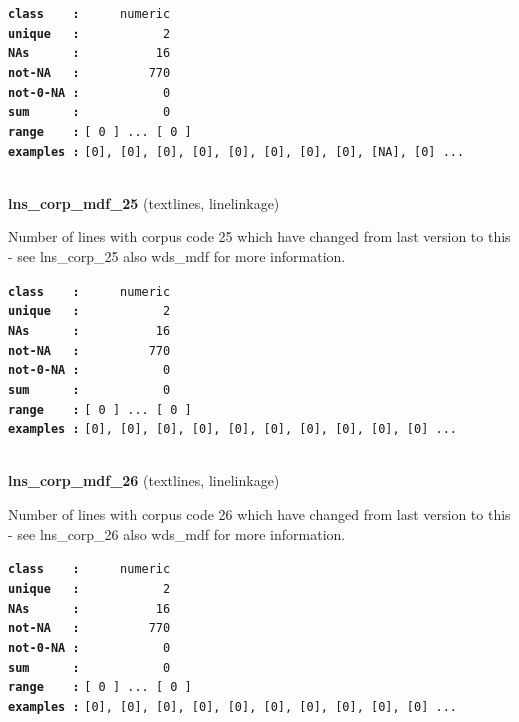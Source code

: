 \documentclass[]{article}
\begin{document}
\textbf{\texttt{class\ \ \ \ :}} \texttt{~~~~~numeric}\\
\textbf{\texttt{unique\ \ \ :}} \texttt{~~~~~~~~~~~2}\\
\textbf{\texttt{NAs\ \ \ \ \ \ :}} \texttt{~~~~~~~~~~16}\\
\textbf{\texttt{not-NA\ \ \ :}} \texttt{~~~~~~~~~770}\\
\textbf{\texttt{not-0-NA\ :}} \texttt{~~~~~~~~~~~0}\\
\textbf{\texttt{sum\ \ \ \ \ \ :}} \texttt{~~~~~~~~~~~0}\\
\textbf{\texttt{range\ \ \ \ :}}
\texttt{{[}\ 0\ {]}\ ...\ {[}\ 0\ {]}}\\
\textbf{\texttt{examples\ :}}
\texttt{{[}0{]},\ {[}0{]},\ {[}0{]},\ {[}0{]},\ {[}0{]},\ {[}0{]},\ {[}0{]},\ {[}0{]},\ {[}NA{]},\ {[}0{]}\ ...}\\

~

\textbf{lns\_corp\_mdf\_25} (textlines, linelinkage)

Number of lines with corpus code 25 which have changed from last version
to this - see lns\_corp\_25 also wds\_mdf for more information.

\textbf{\texttt{class\ \ \ \ :}} \texttt{~~~~~numeric}\\
\textbf{\texttt{unique\ \ \ :}} \texttt{~~~~~~~~~~~2}\\
\textbf{\texttt{NAs\ \ \ \ \ \ :}} \texttt{~~~~~~~~~~16}\\
\textbf{\texttt{not-NA\ \ \ :}} \texttt{~~~~~~~~~770}\\
\textbf{\texttt{not-0-NA\ :}} \texttt{~~~~~~~~~~~0}\\
\textbf{\texttt{sum\ \ \ \ \ \ :}} \texttt{~~~~~~~~~~~0}\\
\textbf{\texttt{range\ \ \ \ :}}
\texttt{{[}\ 0\ {]}\ ...\ {[}\ 0\ {]}}\\
\textbf{\texttt{examples\ :}}
\texttt{{[}0{]},\ {[}0{]},\ {[}0{]},\ {[}0{]},\ {[}0{]},\ {[}0{]},\ {[}0{]},\ {[}0{]},\ {[}0{]},\ {[}0{]}\ ...}\\

~

\textbf{lns\_corp\_mdf\_26} (textlines, linelinkage)

Number of lines with corpus code 26 which have changed from last version
to this - see lns\_corp\_26 also wds\_mdf for more information.

\textbf{\texttt{class\ \ \ \ :}} \texttt{~~~~~numeric}\\
\textbf{\texttt{unique\ \ \ :}} \texttt{~~~~~~~~~~~2}\\
\textbf{\texttt{NAs\ \ \ \ \ \ :}} \texttt{~~~~~~~~~~16}\\
\textbf{\texttt{not-NA\ \ \ :}} \texttt{~~~~~~~~~770}\\
\textbf{\texttt{not-0-NA\ :}} \texttt{~~~~~~~~~~~0}\\
\textbf{\texttt{sum\ \ \ \ \ \ :}} \texttt{~~~~~~~~~~~0}\\
\textbf{\texttt{range\ \ \ \ :}}
\texttt{{[}\ 0\ {]}\ ...\ {[}\ 0\ {]}}\\
\textbf{\texttt{examples\ :}}
\texttt{{[}0{]},\ {[}0{]},\ {[}0{]},\ {[}0{]},\ {[}0{]},\ {[}0{]},\ {[}0{]},\ {[}0{]},\ {[}0{]},\ {[}0{]}\ ...}\\
\end{document}
